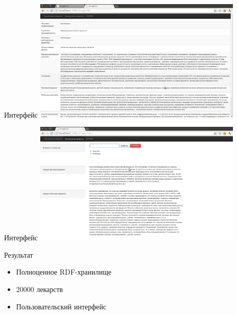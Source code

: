 \documentclass{beamer}
\begin{document}
\begin{frame}{Интерфейс}
  \includegraphics[width=100mm]{drug.png}
\end{frame}
\begin{frame}{Интерфейс}
  \includegraphics[width=100mm]{calc.png}
\end{frame}

\begin{frame}{Результат}
  \begin{itemize}
   \item Полноценное RDF-хранилище
   \item 20000 лекарств
   \item Пользовательский интерфейс
  \end{itemize}

\end{frame}
\end{document}
